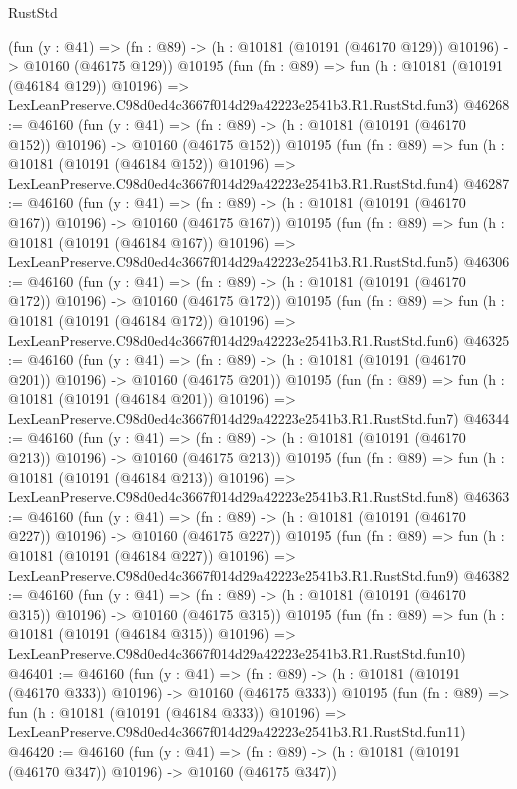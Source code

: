 \begin{lexlean}{RustStd}
\begin{coremodule}
    (fun (y : @41) =>
    (fn : @89) -> (h : @10181 (@10191 (@46170 @129)) @10196) -> @10160 (@46175 @129))
    @10195
    (fun (fn : @89) =>
    fun (h : @10181 (@10191 (@46184 @129)) @10196) =>
    LexLeanPreserve.C98d0ed4c3667f014d29a42223e2541b3.R1.RustStd.fun3)
@46268 := @46160
    (fun (y : @41) =>
    (fn : @89) -> (h : @10181 (@10191 (@46170 @152)) @10196) -> @10160 (@46175 @152))
    @10195
    (fun (fn : @89) =>
    fun (h : @10181 (@10191 (@46184 @152)) @10196) =>
    LexLeanPreserve.C98d0ed4c3667f014d29a42223e2541b3.R1.RustStd.fun4)
@46287 := @46160
    (fun (y : @41) =>
    (fn : @89) -> (h : @10181 (@10191 (@46170 @167)) @10196) -> @10160 (@46175 @167))
    @10195
    (fun (fn : @89) =>
    fun (h : @10181 (@10191 (@46184 @167)) @10196) =>
    LexLeanPreserve.C98d0ed4c3667f014d29a42223e2541b3.R1.RustStd.fun5)
@46306 := @46160
    (fun (y : @41) =>
    (fn : @89) -> (h : @10181 (@10191 (@46170 @172)) @10196) -> @10160 (@46175 @172))
    @10195
    (fun (fn : @89) =>
    fun (h : @10181 (@10191 (@46184 @172)) @10196) =>
    LexLeanPreserve.C98d0ed4c3667f014d29a42223e2541b3.R1.RustStd.fun6)
@46325 := @46160
    (fun (y : @41) =>
    (fn : @89) -> (h : @10181 (@10191 (@46170 @201)) @10196) -> @10160 (@46175 @201))
    @10195
    (fun (fn : @89) =>
    fun (h : @10181 (@10191 (@46184 @201)) @10196) =>
    LexLeanPreserve.C98d0ed4c3667f014d29a42223e2541b3.R1.RustStd.fun7)
@46344 := @46160
    (fun (y : @41) =>
    (fn : @89) -> (h : @10181 (@10191 (@46170 @213)) @10196) -> @10160 (@46175 @213))
    @10195
    (fun (fn : @89) =>
    fun (h : @10181 (@10191 (@46184 @213)) @10196) =>
    LexLeanPreserve.C98d0ed4c3667f014d29a42223e2541b3.R1.RustStd.fun8)
@46363 := @46160
    (fun (y : @41) =>
    (fn : @89) -> (h : @10181 (@10191 (@46170 @227)) @10196) -> @10160 (@46175 @227))
    @10195
    (fun (fn : @89) =>
    fun (h : @10181 (@10191 (@46184 @227)) @10196) =>
    LexLeanPreserve.C98d0ed4c3667f014d29a42223e2541b3.R1.RustStd.fun9)
@46382 := @46160
    (fun (y : @41) =>
    (fn : @89) -> (h : @10181 (@10191 (@46170 @315)) @10196) -> @10160 (@46175 @315))
    @10195
    (fun (fn : @89) =>
    fun (h : @10181 (@10191 (@46184 @315)) @10196) =>
    LexLeanPreserve.C98d0ed4c3667f014d29a42223e2541b3.R1.RustStd.fun10)
@46401 := @46160
    (fun (y : @41) =>
    (fn : @89) -> (h : @10181 (@10191 (@46170 @333)) @10196) -> @10160 (@46175 @333))
    @10195
    (fun (fn : @89) =>
    fun (h : @10181 (@10191 (@46184 @333)) @10196) =>
    LexLeanPreserve.C98d0ed4c3667f014d29a42223e2541b3.R1.RustStd.fun11)
@46420 := @46160
    (fun (y : @41) =>
    (fn : @89) -> (h : @10181 (@10191 (@46170 @347)) @10196) -> @10160 (@46175 @347))

\end{coremodule}
\end{lexlean}
